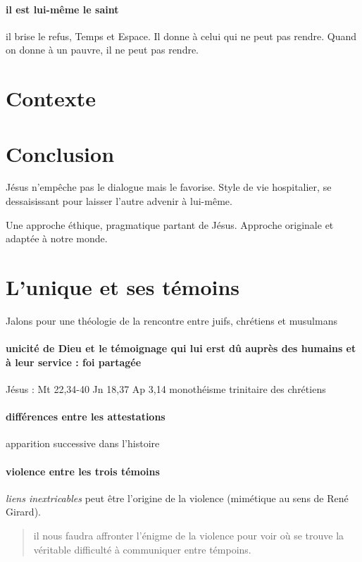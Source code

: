 \paragraph{il est lui-même le saint} il brise le refus, Temps et Espace. Il donne à celui qui ne peut pas rendre. Quand on donne à un pauvre, il ne peut pas rendre.


\section{Contexte}



\section{Conclusion}


Jésus n'empêche pas le dialogue mais le favorise. 
Style de vie hospitalier, se dessaisissant pour laisser l'autre advenir à lui-même. 


\begin{Synthesis}
    Une approche éthique, pragmatique partant de Jésus. Approche originale et adaptée à notre monde.
\end{Synthesis}


 


\section{L'unique et ses témoins }

\cite{theobald_christianisme_2007} Jalons pour une théologie de la rencontre entre juifs, chrétiens et musulmans

\paragraph{unicité de Dieu et le témoignage qui lui erst dû auprès des humains et à leur service : foi partagée}

Jésus : Mt 22,34-40
Jn 18,37
Ap 3,14 monothéisme trinitaire des chrétiens


\paragraph{différences entre les attestations} apparition successive dans l'histoire 

\paragraph{violence entre les trois témoins} \textit{liens inextricables} peut être l'origine de la violence (mimétique au sens de René Girard). 
\begin{quote}
    il nous faudra affronter l'énigme de la violence pour voir où se trouve la véritable difficulté à communiquer entre témpoins. 
\end{quote}
